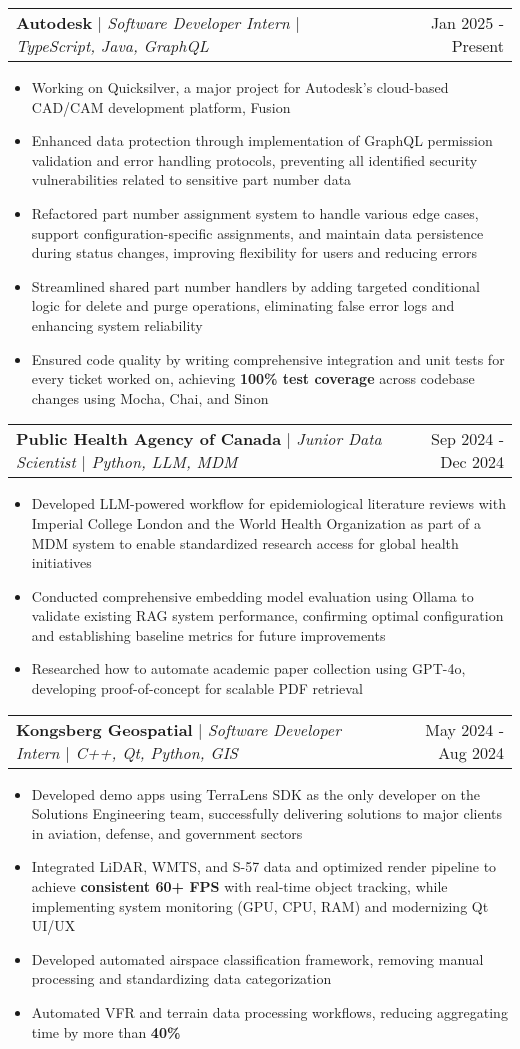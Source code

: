 \documentclass[letterpaper,10pt]{article}
\makeatletter
\newcommand{\resumeItem}[1]{
  \item\small{
    {#1 \vspace{-3pt}}
  }
}
\newcommand{\resumeSubheading}[3]{
    \item
    \begin{tabular*}{0.97\textwidth}[t]{l@{\extracolsep{\fill}}r}
      \textbf{#1} $|$ \textit{ #2} & #3 \\
    \end{tabular*}\vspace{-6pt}
}
\newcommand{\resumeItemListStart}{\begin{itemize}}
\newcommand{\resumeItemListEnd}{\end{itemize}\vspace{-5pt}}
\makeatother
\begin{document}
    \resumeSubheading{Autodesk}{Software Developer Intern $|$ TypeScript, Java, GraphQL}{Jan 2025 - Present}
        \resumeItemListStart
            \resumeItem{Working on Quicksilver, a major project for Autodesk's cloud-based CAD/CAM development platform, Fusion}
            \resumeItem{Enhanced data protection through implementation of GraphQL permission validation and error handling protocols, preventing all identified security vulnerabilities related to sensitive part number data}
            \resumeItem{Refactored part number assignment system to handle various edge cases, support configuration-specific assignments, and maintain data persistence during status changes, improving flexibility for users and reducing errors}
            \resumeItem{Streamlined shared part number handlers by adding targeted conditional logic for delete and purge operations, eliminating false error logs and enhancing system reliability}
            \resumeItem{Ensured code quality by writing comprehensive integration and unit tests for every ticket worked on, achieving \textbf{100\% test coverage} across codebase changes using Mocha, Chai, and Sinon}
    \resumeItemListEnd

    \resumeSubheading{Public Health Agency of Canada}{Junior Data Scientist $|$ Python, LLM, MDM}{Sep 2024 - Dec 2024}
      \resumeItemListStart
        \resumeItem{Developed LLM-powered workflow for epidemiological literature reviews with Imperial College London and the World Health Organization as part of a MDM system to enable standardized research access for global health initiatives}
        \resumeItem{Conducted comprehensive embedding model evaluation using Ollama to validate existing RAG system performance, confirming optimal configuration and establishing baseline metrics for future improvements}
        \resumeItem{Researched how to automate academic paper collection using GPT-4o, developing proof-of-concept for scalable PDF retrieval}
      \resumeItemListEnd

    \resumeSubheading{Kongsberg Geospatial}{Software Developer Intern $|$ C++, Qt, Python, GIS}{May 2024 - Aug 2024}
      \resumeItemListStart
        \resumeItem{Developed demo apps using TerraLens SDK as the only developer on the Solutions Engineering team, successfully delivering solutions to major clients in aviation, defense, and government sectors}
        \resumeItem{Integrated LiDAR, WMTS, and S-57 data and optimized render pipeline to achieve \textbf{consistent 60+ FPS} with real-time object tracking, while implementing system monitoring (GPU, CPU, RAM) and modernizing Qt UI/UX}
        \resumeItem{Developed automated airspace classification framework, removing manual processing and standardizing data categorization}
        \resumeItem{Automated VFR and terrain data processing workflows, reducing aggregating time by more than \textbf{40\%}}
      \resumeItemListEnd
\end{document}
